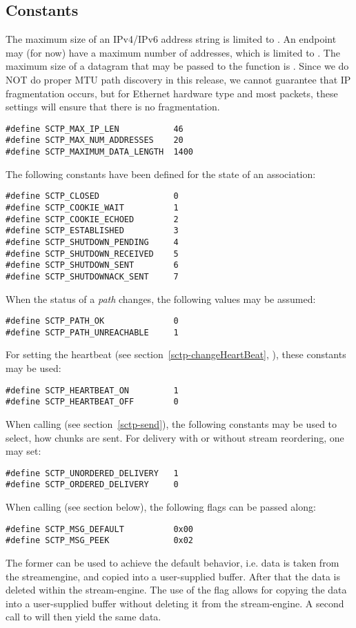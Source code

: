 \documentclass[10pt]{article}
\newcommand{\n}{\normalsize}
\begin{document}
\subsection{Constants}
The maximum size of an IPv4/IPv6 address string is limited to .
An endpoint may (for now) have a maximum number of addresses, which is limited to
. The maximum size of a datagram that may be passed
to the  function is . Since
we do NOT do proper MTU path discovery in this release, we cannot guarantee that
IP fragmentation occurs, but for Ethernet hardware type and most packets, these
settings will ensure that there is no fragmentation.
\footnotesize
\begin{verbatim}
#define SCTP_MAX_IP_LEN           46
#define SCTP_MAX_NUM_ADDRESSES    20
#define SCTP_MAXIMUM_DATA_LENGTH  1400
\end{verbatim}\n
\noindent
The following constants  have been defined for the state of an association:
\footnotesize
\begin{verbatim}
#define SCTP_CLOSED               0
#define SCTP_COOKIE_WAIT          1
#define SCTP_COOKIE_ECHOED        2
#define SCTP_ESTABLISHED          3
#define SCTP_SHUTDOWN_PENDING     4
#define SCTP_SHUTDOWN_RECEIVED    5
#define SCTP_SHUTDOWN_SENT        6
#define SCTP_SHUTDOWNACK_SENT     7
\end{verbatim}\n
\noindent
When the status of a \emph{path} changes, the following values may be assumed:
\footnotesize
\begin{verbatim}
#define SCTP_PATH_OK              0
#define SCTP_PATH_UNREACHABLE     1
\end{verbatim}\n
\noindent
For setting the heartbeat (see section~\ref{sctp-changeHeartBeat}, ),
these constants may be used:
\footnotesize
\begin{verbatim}
#define SCTP_HEARTBEAT_ON         1
#define SCTP_HEARTBEAT_OFF        0
\end{verbatim}\n
\noindent
When calling  (see section~\ref{sctp-send}), the following
constants may be used to select, how chunks are sent. For delivery with
or without stream reordering, one may set:
\footnotesize
\begin{verbatim}
#define SCTP_UNORDERED_DELIVERY   1
#define SCTP_ORDERED_DELIVERY     0
\end{verbatim}\n
\noindent
When calling  (see section below), the following flags 
can be passed along:
\footnotesize
\begin{verbatim}
#define SCTP_MSG_DEFAULT          0x00
#define SCTP_MSG_PEEK             0x02
\end{verbatim}\n
\noindent
The former can be used to achieve the default behavior, i.e. data is taken
from the streamengine, and copied into a user-supplied buffer. After that 
the data is deleted within the stream-engine.
The use of the  flag allows for copying the data
into a user-supplied buffer without deleting it from the stream-engine.
A second call to  will then yield the same data.
\end{document}
